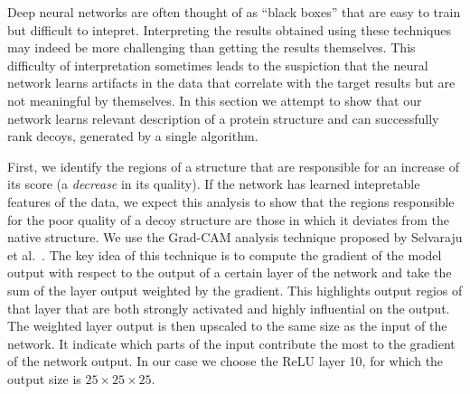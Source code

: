 Deep neural networks are often thought of as ``black boxes'' that are
easy to train but difficult to intepret. Interpreting the results
obtained using these techniques may indeed be more challenging than
getting the results themselves. This difficulty of interpretation
sometimes leads to the suspiction that the neural network learns
artifacts in the data that correlate with the target results but are
not meaningful by themselves.
%
In this section we attempt to show that our network learns relevant
description of a protein structure and can successfully rank decoys, 
generated by a single algorithm.

First, we identify the regions of a structure that are responsible for
an increase of its score (a \emph{decrease} in its quality). If the
network has learned intepretable features of the data, we expect this
analysis to show that the regions responsible for the poor quality of
a decoy structure are those in which it deviates from the native
structure.
%
We use the Grad-CAM analysis technique proposed by Selvaraju et
al.~\cite{selvaraju2016grad}. The key idea of this technique is to
compute the gradient of the model output with respect to the output of a certain layer of the network
and take the sum of the layer output weighted by the gradient.
%
%
This highlights output regios of that layer that are both strongly
activated and highly influential on the output.
%
The weighted layer output is then upscaled to the same size as the input of the network. 
It indicate which parts of the input contribute the most to the gradient of the network output.
%
In our case we choose the ReLU layer 10, for which
the output size is $25\times 25\times 25$.

